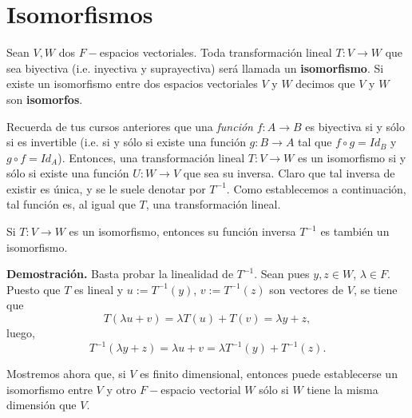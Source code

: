 \section{Isomorfismos}

\begin{defi}
Sean $V, W$ dos $F-$espacios vectoriales. Toda transformación
lineal $T: V \longrightarrow W$ que sea biyectiva 
(i.e. inyectiva y suprayectiva) será llamada
un \textbf{isomorfismo}. Si existe un isomorfismo
entre dos espacios vectoriales $V$ y $W$
decimos que $V$ y $W$ son \textbf{isomorfos}.
\end{defi}

Recuerda de tus cursos anteriores que una \textit{función}
$f: A \longrightarrow B$ es biyectiva si y sólo si 
es invertible (i.e. si y sólo si existe una función
$g: B \longrightarrow A $ tal que $f \circ g = Id_{B}$ y
$g \circ f = Id_{A}$). Entonces, una transformación lineal
$T:V \longrightarrow W$ es un isomorfismo si y sólo si 
existe una función $U: W \longrightarrow V$ que sea su inversa.
Claro que tal inversa de existir es única, y se le suele denotar
por $T^{-1}$.
Como establecemos
a continuación, tal función es, al igual que $T$, una transformación lineal.
\begin{prop}
	Si $T: V \longrightarrow W$ es un isomorfismo, entonces
	su función inversa $T^{-1}$ es también un isomorfismo.
\end{prop}
\noindent
\textbf{Demostración.}
Basta probar la linealidad de $T^{-1}$. Sean pues
$y, z \in W$, $\lambda \in F$. Puesto que $T$ es lineal
y $u := T^{-1}(y)$, $v := T^{-1}(z)$ son vectores de $V$,
se tiene que 
\[
T( \lambda u + v) = \lambda T(u) + T(v) = \lambda y +z,
\]
luego,
\[
T^{-1}(\lambda y + z) = \lambda u + v = \lambda T^{-1}(y) + T^{-1}(z).
\]

\QEDB
\vspace{0.2cm}



Mostremos ahora que,
si $V$ es finito dimensional, entonces puede
establecerse un isomorfismo entre $V$
y otro $F-$espacio vectorial $W$ sólo si
$W$ tiene la misma dimensión que $V$.

